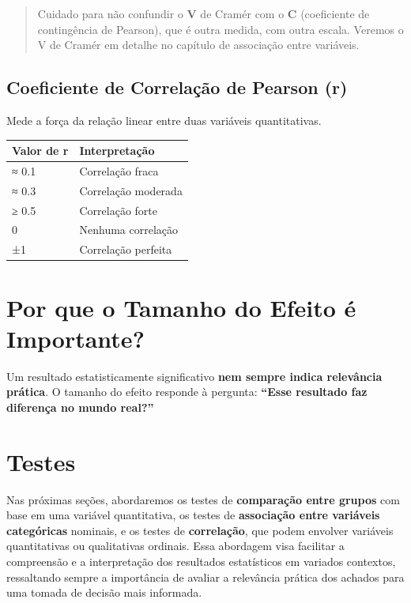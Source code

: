 \documentclass[
]{book}
\newcounter{none} %
\begin{document}
\begin{quote}
Cuidado para não confundir o \textbf{V} de Cramér com o \textbf{C} (coeficiente de contingência de Pearson), que é outra medida, com outra escala. Veremos o V de Cramér em detalhe no capítulo de associação entre variáveis.
\end{quote}

\subsection{Coeficiente de Correlação de Pearson (r)}\label{coeficiente-de-correlauxe7uxe3o-de-pearson-r}

Mede a força da relação linear entre duas variáveis quantitativas.

{\def\LTcaptype{none} %
\begin{longtable}[]{@{}ll@{}}
\toprule\noalign{}
Valor de r & Interpretação \\
\midrule\noalign{}
\endhead
\bottomrule\noalign{}
\endlastfoot
≈ 0.1 & Correlação fraca \\
≈ 0.3 & Correlação moderada \\
≥ 0.5 & Correlação forte \\
0 & Nenhuma correlação \\
±1 & Correlação perfeita \\
\end{longtable}
}

\section{Por que o Tamanho do Efeito é Importante?}\label{por-que-o-tamanho-do-efeito-uxe9-importante}

Um resultado estatisticamente significativo \textbf{nem sempre indica relevância prática}. O tamanho do efeito responde à pergunta: \textbf{``Esse resultado faz diferença no mundo real?''}

\section{Testes}\label{testes}

Nas próximas seções, abordaremos os testes de \textbf{comparação entre grupos} com base em uma variável quantitativa, os testes de \textbf{associação entre variáveis categóricas} nominais, e os testes de \textbf{correlação}, que podem envolver variáveis quantitativas ou qualitativas ordinais. Essa abordagem visa facilitar a compreensão e a interpretação dos resultados estatísticos em variados contextos, ressaltando sempre a importância de avaliar a relevância prática dos achados para uma tomada de decisão mais informada.
\end{document}
